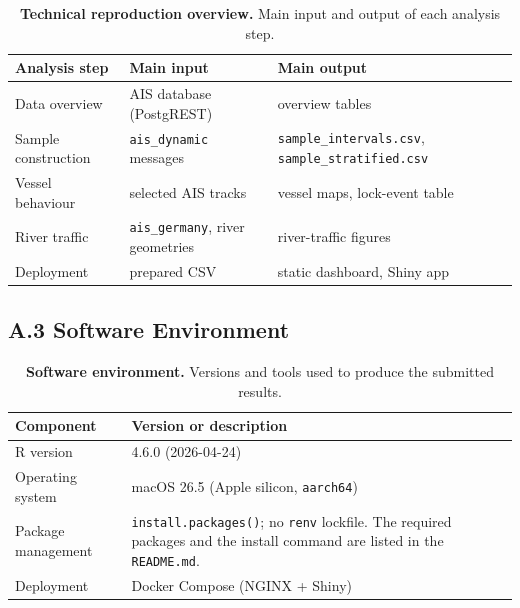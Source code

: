 \documentclass[10pt,a4paper]{article}
\begin{document}
\begin{table}[h]
    \centering
    \caption{\textbf{Technical reproduction overview.} Main input and output of each analysis step.}
    \label{tab:repro}
    \begin{tabular}{p{3cm} p{4.3cm} p{6.2cm}}
        \toprule
        \textbf{Analysis step} & \textbf{Main input} & \textbf{Main output} \\
        \midrule
        Data overview       & AIS database (PostgREST)                & overview tables \\
        Sample construction & \texttt{ais\_dynamic} messages          & \texttt{sample\_intervals.csv}, \texttt{sample\_stratified.csv} \\
        Vessel behaviour    & selected AIS tracks                     & vessel maps, lock-event table \\
        River traffic       & \texttt{ais\_germany}, river geometries & river-traffic figures \\
        Deployment          & prepared CSV                            & static dashboard, Shiny app \\
        \bottomrule
    \end{tabular}
\end{table}

\subsection*{A.3 Software Environment}

\begin{table}[h]
    \centering
    \caption{\textbf{Software environment.} Versions and tools used to produce the submitted results.}
    \label{tab:software}
    \begin{tabular}{l p{10.5cm}}
        \toprule
        \textbf{Component} & \textbf{Version or description} \\
        \midrule
        R version          & 4.6.0 (2026-04-24) \\
        Operating system   & macOS 26.5 (Apple silicon, \texttt{aarch64}) \\
        Package management & \texttt{install.packages()}; no \texttt{renv} lockfile. The required packages and the install command are listed in the \texttt{README.md}. \\
        Deployment         & Docker Compose (NGINX + Shiny) \\
        \bottomrule
    \end{tabular}
\end{table}
\end{document}
